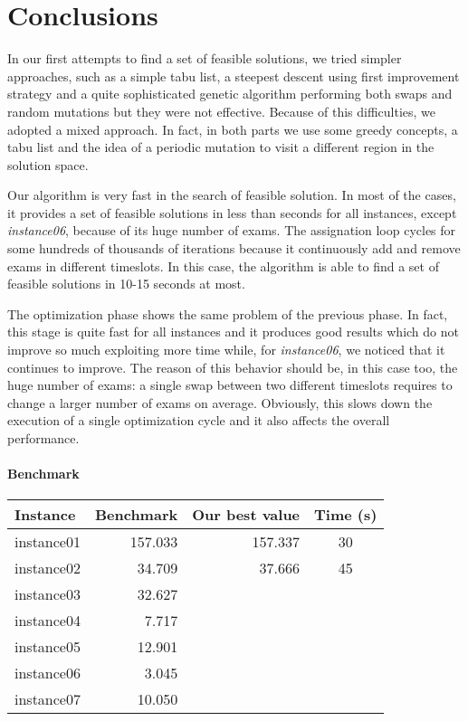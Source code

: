 \section*{Conclusions}
In our first attempts to find a set of feasible solutions, we tried simpler approaches, such as a simple tabu list, a steepest descent using first improvement strategy and a quite sophisticated genetic algorithm performing both swaps and random mutations but they were not effective. Because of this difficulties, we adopted a mixed approach. In fact, in both parts we use some greedy concepts, a tabu list and the idea of a periodic mutation to visit a different region in the solution space.

Our algorithm is very fast in the search of feasible solution. In most of the cases, it provides a set of feasible solutions in less than seconds for all instances, except \emph{instance06}, because of its huge number of exams. The assignation loop cycles for some hundreds of thousands of iterations because it continuously add and remove exams in different timeslots. In this case, the algorithm is able to find a set of feasible solutions in 10-15 seconds at most.

The optimization phase shows the same problem of the previous phase. In fact, this stage is quite fast for all instances and it produces good results which do not improve so much exploiting more time while, for \emph{instance06}, we noticed that it continues to improve. The reason of this behavior should be, in this case too, the huge number of exams: a single swap between two different timeslots requires to change a larger number of exams on average. Obviously, this slows down the execution of a single optimization cycle and it also affects the overall performance.

\paragraph*{Benchmark}
\begin{center}
\begin{tabular}{lrrc}
\toprule
Instance	&	Benchmark	&	Our best value	&	Time (s)	\\
\midrule
instance01	&	157.033	&	157.337	&	30	\\
instance02	&	34.709	&	37.666	&	45	\\
instance03	&	32.627	&	&		\\
instance04	&	7.717	&	&		\\
instance05	&	12.901	&	&		\\
instance06	&	3.045	&	&		\\
instance07	&	10.050	&	&		\\
\bottomrule
\end{tabular}
\end{center}